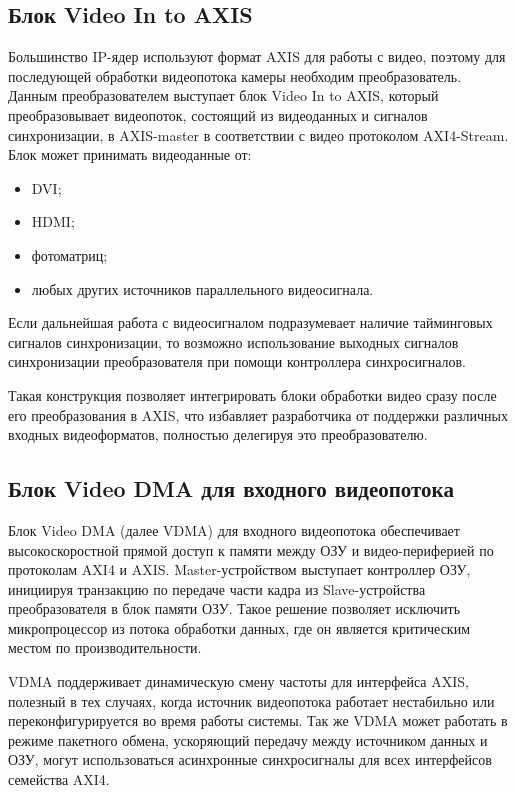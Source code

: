 \subsection{Блок Video In to AXIS}
\label{sec:structural:video_in_to_axis}
Большинство IP-ядер используют формат AXIS для работы с видео, поэтому для последующей обработки
видеопотока камеры необходим преобразователь. Данным преобразователем выступает блок Video In to AXIS,
который преобразовывает видеопоток, состоящий из видеоданных и сигналов синхронизации, в
AXIS-master в соответствии с видео протоколом AXI4-Stream. Блок может принимать
видеоданные от:
\begin{itemize}
  \item DVI;
  \item HDMI;
  \item фотоматриц;
  \item любых других источников параллельного видеосигнала.
\end{itemize}

Если дальнейшая работа с видеосигналом подразумевает наличие тайминговых сигналов синхронизации,
то возможно использование выходных сигналов синхронизации преобразователя при помощи контроллера
синхросигналов.

Такая конструкция позволяет интегрировать блоки обработки видео сразу после его преобразования в AXIS,
что избавляет разработчика от поддержки различных входных видеоформатов, полностью делегируя это преобразователю.

\subsection{Блок Video DMA для входного видеопотока}
\label{sec:structural:vdma_in}
Блок Video DMA (далее VDMA) для входного видеопотока обеспечивает высокоскоростной прямой доступ к памяти
между ОЗУ и видео-периферией по протоколам AXI4 и AXIS. Master-устройством выступает контроллер ОЗУ,
инициируя транзакцию по передаче части кадра из Slave-устройства преобразователя в блок памяти ОЗУ.
Такое решение позволяет исключить микропроцессор из потока обработки данных, где он является
критическим местом по производительности.

VDMA поддерживает динамическую смену частоты для интерфейса AXIS, полезный в тех случаях,
когда источник видеопотока работает нестабильно или переконфигурируется во время работы системы.
Так же VDMA может работать в режиме пакетного обмена, ускоряющий передачу между источником данных и ОЗУ,
могут использоваться асинхронные синхросигналы для всех интерфейсов семейства AXI4.

